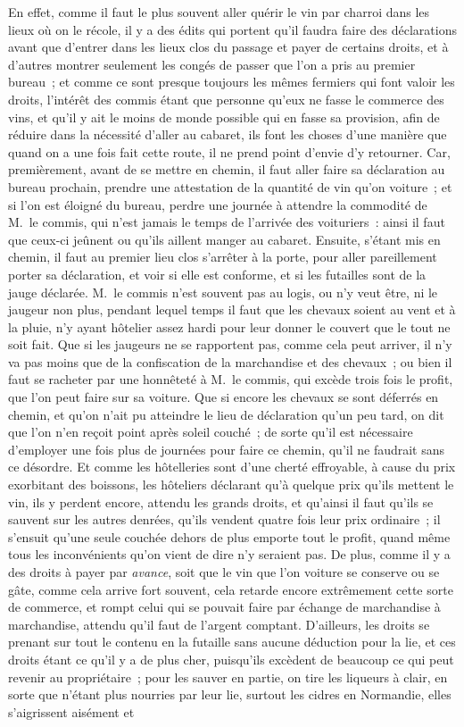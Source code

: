 \documentclass[french,twoside]{book} %
\begin{document}
En effet, comme il faut le plus souvent aller quérir le vin par charroi dans les lieux où on le récole, il y a des édits qui portent qu’il faudra faire des déclarations avant que d’entrer dans les lieux clos du passage et payer de certains droits, et à d’autres montrer seulement les congés de passer que l’on a pris au premier bureau ; et comme ce sont presque toujours les mêmes fermiers qui font valoir les droits, l’intérêt des commis étant que personne qu’eux ne fasse le commerce des vins, et qu’il y ait le moins de monde possible qui en fasse sa provision, afin de réduire dans la nécessité d’aller au cabaret, ils font les choses d’une manière que quand on a une fois fait cette route, il ne prend point d’envie d’y retourner. Car, premièrement, avant de se mettre en chemin, il faut aller faire sa déclaration au bureau prochain, prendre une attestation de la quantité de vin qu’on voiture ; et si l’on est éloigné du bureau, perdre une journée à attendre la commodité de M. le commis, qui n’est jamais le temps de l’arrivée des voituriers : ainsi il faut que ceux-ci jeûnent ou qu’ils aillent manger au cabaret. Ensuite, s’étant mis en chemin, il faut au premier lieu clos s’arrêter à la porte, pour aller pareillement porter sa déclaration, et voir si elle est conforme, et si les futailles sont de la jauge déclarée. M. le commis n’est souvent pas au logis, ou n’y veut être, ni le jaugeur non plus, pendant lequel temps il faut que les chevaux soient au vent et à la pluie, n’y ayant hôtelier assez hardi pour leur donner le couvert que le tout ne soit fait. Que si les jaugeurs ne se rapportent pas, comme cela peut arriver, il n’y va pas moins que de la confiscation de la marchandise et des chevaux ; ou bien il faut se racheter par une honnêteté à M. le commis, qui excède trois fois le profit, que l’on peut faire sur sa voiture. Que si encore les chevaux se sont déferrés en chemin, et qu’on n’ait pu atteindre le lieu de déclaration qu’un peu tard, on dit que l’on n’en reçoit point après soleil couché ; de sorte qu’il est nécessaire d’employer une fois plus de journées pour faire ce chemin, qu’il ne faudrait sans ce désordre. Et comme les hôtelleries sont d’une cherté effroyable, à cause du prix exorbitant des boissons, les hôteliers déclarant qu’à quelque prix qu’ils mettent le vin, ils y perdent encore, attendu les grands droits, et qu’ainsi il faut qu’ils se sauvent sur les autres denrées, qu’ils vendent quatre fois leur prix ordinaire ; il s’ensuit qu’une seule couchée dehors de plus emporte tout le profit, quand même tous les inconvénients qu’on vient de dire n’y seraient pas. De plus, comme il y a des droits à payer par {\itshape avance}, soit que le vin que l’on voiture se conserve ou se gâte, comme cela arrive fort souvent, cela retarde encore extrêmement cette sorte de commerce, et rompt celui qui se pouvait faire par échange de marchandise à marchandise, attendu qu’il faut de l’argent comptant. D’ailleurs, les droits se prenant sur tout le contenu en la futaille sans aucune déduction pour la lie, et ces droits étant ce qu’il y a de plus cher, puisqu’ils excèdent de beaucoup ce qui peut revenir au propriétaire ; pour les sauver en partie, on tire les liqueurs à clair, en sorte que n’étant plus nourries par leur lie, surtout les cidres en Normandie, elles s’aigrissent aisément et 
\end{document}
